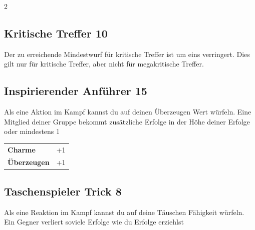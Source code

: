 \begin{multicols}{2}
\begin{tcolorbox}

\end{tcolorbox}

\begin{tcolorbox}
    \subsection*{Kritische Treffer \hfill \small{10 }}
    \tcblower
Der zu erreichende Mindestwurf für kritische Treffer ist um eins verringert. Dies gilt nur für kritische Treffer, aber nicht für megakritische Treffer.


\vspace{3mm}



\end{tcolorbox}

\begin{tcolorbox}
    \subsection*{Inspirierender Anführer \hfill \small{15 }}
    \tcblower
Als eine Aktion im Kampf kannst du auf deinen Überzeugen Wert würfeln. Eine Mitglied deiner Gruppe bekommt zusätzliche Erfolge in der Höhe deiner Erfolge oder mindestens 1


\vspace{3mm}

\begin{tabular}{@{}ll@{}}
    \textbf{Charme} & +1\\
    \textbf{Überzeugen} & +1\\
\end{tabular}


\end{tcolorbox}

\begin{tcolorbox}
    \subsection*{Taschenspieler Trick \hfill \small{8 }}
    \tcblower
Als eine Reaktion im Kampf kannst du auf deine Täuschen Fähigkeit würfeln. Ein Gegner verliert soviele Erfolge wie du Erfolge erziehlst


\end{tcolorbox}
\end{multicols}
